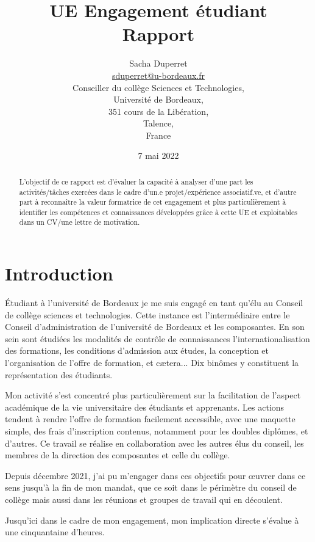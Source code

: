\documentclass{article}
\title{{\huge UE Engagement étudiant\\Rapport}}
\author{$ $\\{\LARGE Sacha Duperret}\\ $ $\\ \href{mailto:sduperret@u-bordeaux.fr}{sduperret@u-bordeaux.fr}\\Conseiller du collège Sciences et Technologies,\\Université de Bordeaux,\\351 cours de la Libération,\\Talence,\\France}
\date{7 mai 2022}
\begin{document}
\maketitle

\vspace{20pt}

\tableofcontents

\vspace{50pt}

\begin{abstract}
L'objectif de ce rapport est d'évaluer la capacité à analyser d’une part les activités/tâches exercées dans le cadre d'un.e projet/expérience associatif.ve, et d’autre part à reconnaître la valeur formatrice de cet engagement et plus particulièrement à identifier les compétences et connaissances développées grâce à cette UE et exploitables dans un CV/une lettre de motivation.
\end{abstract}

\newpage \section*{Introduction}

Étudiant à l'université de Bordeaux je me suis engagé en tant qu'élu au Conseil de collège sciences et technologies. 
Cette instance est l’intermédiaire entre le Conseil d'administration de l'université de Bordeaux et les composantes. 
En son sein sont étudiées les modalités de contrôle de connaissances l’internationalisation des formations, les conditions d'admission aux études, la conception et l'organisation de l'offre de formation, et cætera... 
Dix binômes y constituent la représentation des étudiants. 

Mon activité s'est concentré plus particulièrement sur la facilitation de l'aspect académique de la vie universitaire des étudiants et apprenants. Les actions tendent à rendre l’offre de formation facilement accessible, avec une maquette simple, des frais d'inscription contenus, notamment pour les doubles diplômes, et d'autres. Ce travail se réalise en collaboration avec les autres élus du conseil, les membres de la direction des composantes et celle du collège. 

Depuis décembre 2021, j’ai pu m’engager dans ces objectifs pour œuvrer dans ce sens jusqu’à la fin de mon mandat, que ce soit dans le périmètre du conseil de collège mais aussi dans les réunions et groupes de travail qui en découlent. 

\newpage
Jusqu'ici dans le cadre de mon engagement, mon implication directe s’évalue à une cinquantaine d'heures. 
\end{document}

